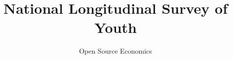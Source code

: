 

\title{National Longitudinal Survey of Youth}
\author{Open Source Economics}

\date{}

\let\otp\titlepage
